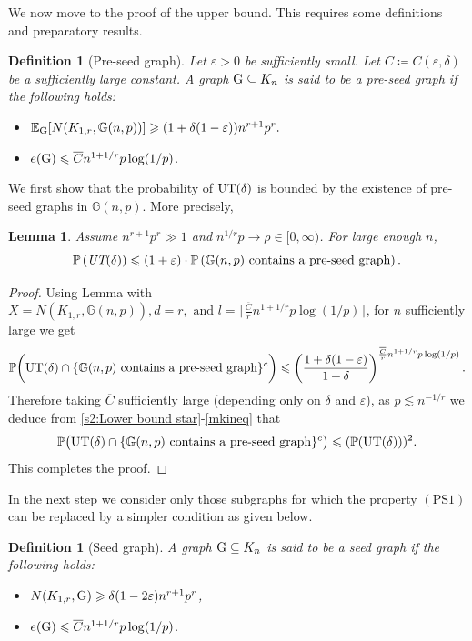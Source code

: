 \documentclass[a4paper,11pt,english,reqno]{amsart}
\numberwithin{equation}{section}
\renewcommand{\leq}{\leqslant}
\renewcommand{\geq}{\geqslant}
\newcommand{\cbar}{\overline{C}}
\newcommand{\E}{\mathbb{E}}
\newcommand{\UT}{\textup{UT}(\delta)}
\renewcommand{\P}{\mathbb{P}}
\newcommand{\G}{\mathbb{G}}
\newcommand{\tu}[1]{\textup{#1}}
\newtheorem{definition}[theorem]{Definition}
\newtheorem{lemma}[theorem]{Lemma}
\begin{document}
			We now move to the proof of the upper bound. This requires some definitions and preparatory results.
			\begin{definition}[Pre-seed graph] Let $\varepsilon>0$ be sufficiently small. Let $\cbar\coloneqq\cbar(\varepsilon, \delta)$ be a sufficiently large constant. A graph $\tu{G}\subseteq K_n$ is said to be a pre-seed graph if the following holds:
				\begin{itemize}
					\item[(PS1)]$\E_{\tu{G}}[N(K_{1,r}, \G(n,p))]\geq (1+\delta(1-\varepsilon))n^{r+1}p^{r}.$ 
					\item[(PS2)] $e(\tu{G})\leq \cbar n^{1+1/r}p\log(1/p)$.
				\end{itemize}
			\end{definition}
			We first show that the probability of $\UT$ is bounded by the existence of pre-seed graphs in $\G(n,p)$. More precisely,
			\begin{lemma}
				\label{upper bound preseed}
				Assume $n^{r+1}p^{r}\gg 1$ and $n^{1/r}p\rightarrow \rho\in [0,\infty)$.
				For large enough $n$, 
				\begin{equation*}
					\P\left(\text{\em{UT}}(\delta)\right) \leq (1+\varepsilon)\cdot\P\left(\G(n,p)\textup{ contains a pre-seed graph}\right).
				\end{equation*}
			\end{lemma}
			
			
			\begin{proof}
				
				Using Lemma \cite[Lemma~3.7]{HMS} with $X=N(K_{1,r}, \G(n,p)), d=r, \text{ and }l=\lceil \frac{\cbar}{r} n^{1+1/r}p \log(1/p) \rceil$, for $n$ sufficiently large we get
				\begin{equation}
					\label{mkineq}
					\P\bigg(\UT\cap\{\G(n,p) \text{ contains a pre-seed graph}\}^{c}\bigg) \leq \left(\frac{1+\delta(1-\varepsilon)}{1+\delta} \right)^{\frac{\cbar}{r} n^{1+1/r}p \log(1/p)}.
				\end{equation}
				Therefore taking $\cbar$ sufficiently large (depending only on $\delta$ and $\varepsilon$), as $p \lesssim n^{-1/r}$ we deduce from \eqref{s2:Lower bound star}-\eqref{mkineq} that
				\begin{equation}\label{eq:prob-small}
					\P\big(\UT\cap\{\G(n,p)\text{ contains a pre-seed graph}\}^{c}\big)\leq (\P(\UT))^2.
				\end{equation}
				This completes the proof.
			\end{proof}
			In the next step we consider only those subgraphs for which the property $(\text{PS}1)$ can be replaced by a simpler condition as given below.
			\begin{definition}[Seed graph]
				A graph $\tu{G}\subseteq K_n$ is said to be a seed graph if the following holds:
				\begin{itemize}
					\item[(S1)] $N(K_{1,r}, \tu{G})\geq \delta(1-2\varepsilon)n^{r+1}p^r$,
					\item[(S2)] $e(\tu{G})\leq \cbar n^{1+1/r}p \log(1/p)$.
				\end{itemize}
			\end{definition}
			
\end{document}
